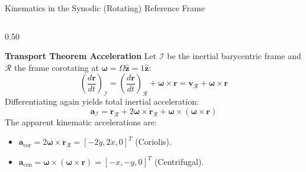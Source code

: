 \documentclass[aspectratio=169, 10pt]{beamer}
\begin{document}
\begin{frame}{Kinematics in the Synodic (Rotating) Reference Frame}
    \begin{columns}[t]
        \begin{column}{0.50\textwidth}
            \begin{block}{\textbf{Transport Theorem Acceleration}}
                \scriptsize
                Let $\mathcal{I}$ be the inertial barycentric frame and $\mathcal{R}$ the frame corotating at $\bm{\omega} = \Omega \hat{\mathbf{z}} = 1\hat{\mathbf{z}}$:
                \begin{equation*}
                    \left(\frac{d\mathbf{r}}{dt}\right)_\mathcal{I} = \left(\frac{d\mathbf{r}}{dt}\right)_\mathcal{R} + \bm{\omega} \times \mathbf{r} = \mathbf{v}_\mathcal{R} + \bm{\omega} \times \mathbf{r}
                \end{equation*}
                Differentiating again yields total inertial acceleration:
                \begin{equation*}
                    \mathbf{a}_\mathcal{I} = \ddot{\mathbf{r}}_\mathcal{R} + 2\bm{\omega} \times \dot{\mathbf{r}}_\mathcal{R} + \bm{\omega} \times (\bm{\omega} \times \mathbf{r})
                \end{equation*}
                The apparent kinematic accelerations are:
                \begin{itemize}\setlength{\itemsep}{1.5pt}
                    \item $\mathbf{a}_{\text{cor}} = 2\bm{\omega} \times \dot{\mathbf{r}}_\mathcal{R} = [-2\dot{y}, 2\dot{x}, 0]^T$ (Coriolis).
                    \item $\mathbf{a}_{\text{cen}} = \bm{\omega} \times (\bm{\omega} \times \mathbf{r}) = [-x, -y, 0]^T$ (Centrifugal).
                \end{itemize}
            \end{block}
        \end{column}
        

\end{columns}
\end{frame}
\end{document}
